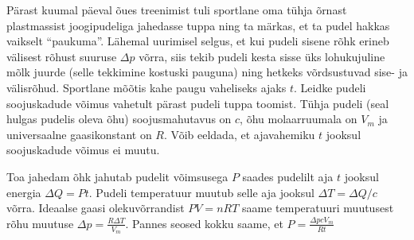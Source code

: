 
Pärast kuumal päeval õues treenimist tuli sportlane oma tühja õrnast plastmassist joogipudeliga jahedasse tuppa ning ta märkas, et ta pudel hakkas vaikselt \enquote{paukuma}. Lähemal uurimisel selgus, et kui pudeli sisene rõhk erineb välisest rõhust suuruse $\Delta p$ võrra, siis tekib pudeli kesta sisse üks lohukujuline mõlk juurde (selle tekkimine kostuski pauguna) ning hetkeks võrdsustuvad sise- ja välisrõhud. Sportlane mõõtis kahe paugu vaheliseks ajaks $t$. Leidke pudeli soojuskadude võimus vahetult pärast pudeli tuppa toomist. Tühja pudeli (seal hulgas pudelis oleva õhu) soojusmahutavus on $c$, õhu molaarruumala on $V_m$ ja universaalne gaasikonstant on $R$. Võib eeldada, et ajavahemiku $t$ jooksul soojuskadude võimus ei muutu.


\hint

\solu
Toa jahedam õhk jahutab pudelit võimsusega $P$ saades pudelilt aja $t$ jooksul energia $\Delta Q = Pt$. Pudeli temperatuur muutub selle aja jooksul $\Delta T = \Delta Q/c$ võrra. Ideaalse gaasi olekuvõrrandist $PV=nRT$ saame temperatuuri muutusest rõhu muutuse $\Delta p = \frac{R \Delta T}{V_m} $. Pannes seosed kokku saame, et $P = \frac{\Delta p c V_m }{Rt}$
\probend